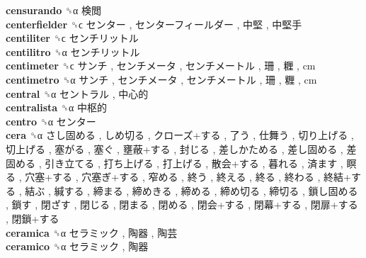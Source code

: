 \textbf{censurando} ␝α   検閲   \\
\textbf{centerfielder} ␝ϲ   センター ,  センターフィールダー ,  中堅 ,  中堅手   \\
\textbf{centiliter} ␝ϲ   センチリットル   \\
\textbf{centilitro} ␝α   センチリットル   \\
\textbf{centimeter} ␝ϲ   サンチ ,  センチメータ ,  センチメートル ,  珊 ,  糎 , cm  \\
\textbf{centimetro} ␝α   サンチ ,  センチメータ ,  センチメートル ,  珊 ,  糎 , cm  \\
\textbf{central} ␝α   セントラル ,  中心的   \\
\textbf{centralista} ␝α   中枢的   \\
\textbf{centro} ␝α   センター   \\
\textbf{cera} ␝α   さし固める ,  しめ切る ,  クローズ+する ,  了う ,  仕舞う ,  切り上げる ,  切上げる ,  塞がる ,  塞ぐ ,  壅蔽+する ,  封じる ,  差しかためる ,  差し固める ,  差固める ,  引き立てる ,  打ち上げる ,  打上げる ,  散会+する ,  暮れる ,  済ます ,  瞑る ,  穴塞+する ,  穴塞ぎ+する ,  窄める ,  終う ,  終える ,  終る ,  終わる ,  終結+する ,  結ぶ ,  緘する ,  締まる ,  締めきる ,  締める ,  締め切る ,  締切る ,  鎖し固める ,  鎖す ,  閉ざす ,  閉じる ,  閉まる ,  閉める ,  閉会+する ,  閉幕+する ,  閉扉+する ,  閉鎖+する   \\
\textbf{ceramica} ␝α   セラミック ,  陶器 ,  陶芸   \\
\textbf{ceramico} ␝α   セラミック ,  陶器   \\

